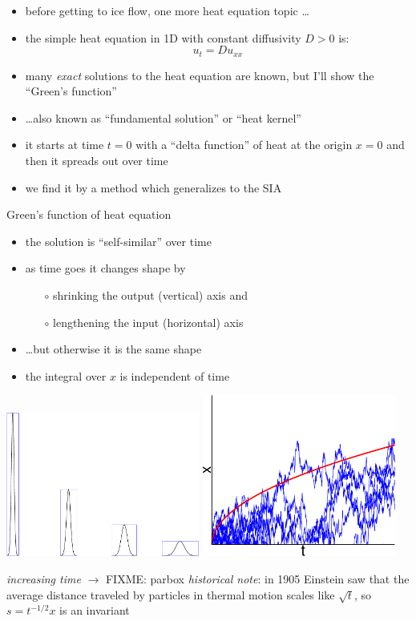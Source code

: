 \documentclass[titlepage,letterpaper,final,11pt]{scrartcl}
\begin{document}
\begin{itemize}
\item before getting to ice flow, one more heat equation topic \dots
\item the simple heat equation in 1D with constant diffusivity $D>0$ is:
	$$u_t = D u_{xx}$$
\item many \emph{exact} solutions to the heat equation are known, but I'll show the ``Green's function''
\item \dots also known as ``fundamental solution'' or ``heat kernel''
\item it starts at time $t=0$ with a ``delta function'' of heat at the origin $x=0$ and then it spreads out over time
\item we find it by a method which generalizes to the SIA
\end{itemize}

Green's function of heat equation

\begin{itemize}
\item the solution is ``self-similar'' over time
\item as time goes it changes shape by
  \begin{itemize}
  \item[$\circ$] shrinking the output (vertical) axis and
  \item[$\circ$] lengthening the input (horizontal) axis
  \end{itemize}
\item \dots but otherwise it is the same shape
\item the integral over $x$ is independent of time
\end{itemize}

\begin{center}
\includegraphics[width=2.5in]{heatscaling}
\quad
\includegraphics[width=2.5in]{brownian}

\emph{increasing time} $\to$ \qquad FIXME: parbox {\emph{historical note}:  in 1905 Einstein saw that the average distance traveled by particles in thermal motion scales like $\sqrt{t}$, so $s = t^{-1/2}x$ is an invariant}
\end{center}
\end{document}

